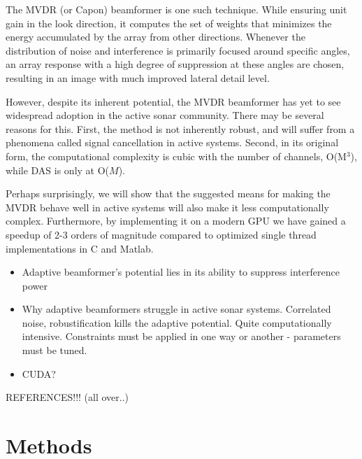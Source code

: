 \documentclass[10pt,a4paper]{article}
\newcommand\1{\vec 1}
\renewcommand\gls[1]{#1}
\begin{document}
The \gls{MVDR} (or Capon) beamformer is one such technique. While ensuring unit gain in the look direction, it computes the set of weights that minimizes the energy accumulated by the array from other directions. Whenever the distribution of noise and interference is primarily focused around specific angles, an array response with a high degree of suppression at these angles are chosen, resulting in an image with much improved lateral detail level.

However, despite its inherent potential, the \gls{MVDR} beamformer has yet to see widespread adoption in the active sonar community. There may be several reasons for this. First, the method is not inherently robust, and will suffer from a phenomena called signal cancellation in active systems. Second, in its original form, the computational complexity is cubic with the number of channels, O(M$^3$), while \gls{DAS} is only at O($M$).

Perhaps surprisingly, we will show that the suggested means for making the \gls{MVDR} behave well in active systems will also make it less computationally complex. Furthermore, by implementing it on a modern \gls{GPU} we have gained a speedup of 2-3 orders of magnitude compared to optimized single thread implementations in C and Matlab.


\begin{itemize}
\item Adaptive beamformer's potential lies in its ability to suppress interference power
\item Why adaptive beamformers struggle in active sonar systems. Correlated noise, robustification kills the adaptive potential. Quite computationally intensive. Constraints must be applied in one way or another - parameters must be tuned.
\item CUDA?
\end{itemize}

REFERENCES!!! (all over..)
% 


\newpage
\section{Methods}\label{methods}
\end{document}
